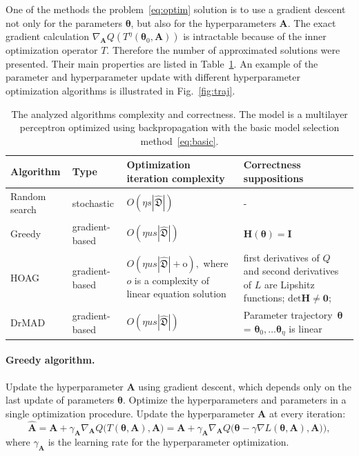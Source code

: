 \documentclass[smallcondensed]{svjour3}
\begin{document}
One of the methods the problem~\eqref{eq:optim} solution is to use a gradient descent not only for the parameters $\boldsymbol{\theta}$, but also for the hyperparameters $\mathbf{A}$. 
The exact gradient calculation $\nabla_{\mathbf{A}} Q( T^\eta(\boldsymbol{\theta}_0, \mathbf{A}))$ is intractable because of the inner optimization operator $T$. Therefore the number of approximated solutions were presented. Their main properties are listed in Table~\ref{table:algo_descr2}. An example of the parameter and hyperparameter update with different hyperparameter optimization algorithms is illustrated in Fig.~\ref{fig:traj}.

\begin{table}
\small


\begin{tabularx}{\textwidth}{|X|X|X|X|}
\hline
\bf Algorithm & \bf Type & \bf Optimization iteration complexity & \bf Correctness suppositions  \\ 
\hline
Random search & stochastic & $O(\eta s |\hat{\mathfrak{D}}|)$& -  \\ \hline
Greedy~\cite{hyper_greed} & gradient-based & $O(\eta us |\hat{\mathfrak{D}}|)$ & $\mathbf{H}(\boldsymbol{\theta}) = \mathbf{I}$  \\ \hline
HOAG~\cite{hyper_hoag} & gradient-based & $O(\eta us |\hat{\mathfrak{D}}| + \text{o}),$ where $o$ is a complexity of linear equation solution& first derivatives of $Q$  and second derivatives of $L$ are Lipshitz functions;  $\text{det}\mathbf{H} \neq \mathbf{0}$;  \\ \hline
DrMAD~\cite{hyper_mad} & gradient-based &$O(\eta us |\hat{\mathfrak{D}}|)$ & Parameter trajectory~$\boldsymbol{\theta}$ = $\boldsymbol{\theta}_0, \dots \boldsymbol{\theta}_\eta$  is linear \\ \hline
\end{tabularx}

\caption{The analyzed algorithms complexity and correctness. The model is a multilayer perceptron optimized using backpropagation with the basic model selection method~\eqref{eq:basic}.}
\label{table:algo_descr2}

\end{table}


\paragraph{Greedy algorithm.}
Update the hyperparameter $\mathbf{A}$ using gradient descent, which depends only on the last update of parameters $\boldsymbol{\theta}$. Optimize the hyperparameters and parameters in a single optimization procedure. Update the hyperparameter $\mathbf{A}$ at every iteration:
\[
	\hat{\mathbf{A}} = \mathbf{A} + \gamma_{\mathbf{A}} \nabla_{\mathbf{A}}  Q \bigl(T(\boldsymbol{\theta}, \mathbf{A}) , \mathbf{A}\bigr) = \mathbf{A} + \gamma_{\mathbf{A}} \nabla_{\mathbf{A}}  Q\bigl(\boldsymbol{\theta} - \gamma \nabla L(\boldsymbol{\theta}, \mathbf{A}), \mathbf{A})\bigr),
\]
where $\gamma_{\mathbf{A}}$ is the learning rate for the hyperparameter optimization.
\end{document}
